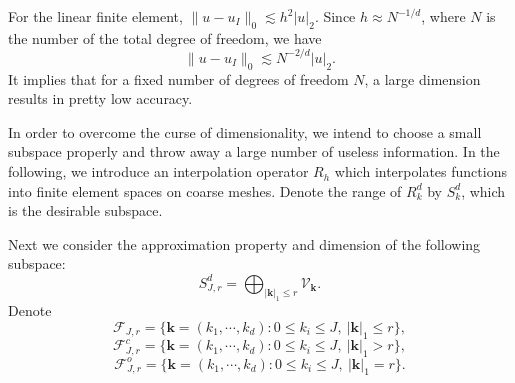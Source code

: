 For the linear finite element,
$
\|u-u_I\|_0\lesssim h^2|u|_2.
$
Since $h\approx N^{-1/d}$, where $N$ is the number of the total degree of freedom, we have
$$
\|u-u_I\|_0\lesssim N^{-2/d}|u|_2.
$$
It implies that for a fixed number of degrees of freedom $N$, a large dimension results in pretty low accuracy.

In order to overcome the curse of dimensionality, we intend to choose a small subspace properly and throw away a large number of useless information. In the following, we introduce an interpolation operator $R_h$ which interpolates functions into finite element spaces on coarse meshes. Denote the range of $R_k^d$ by $S_k^d$, which is the desirable subspace.

Next we consider the approximation property and dimension  of the following subspace:
$$
S_{J,r}^d = \bigoplus_{|\mathbf{k}|_1 \le r}\mathcal V_{\mathbf{k}}.
$$
Denote
$$
\mathcal F_{J,r}=\{\mathbf k=(k_1,\cdots,k_d): 0\leq k_i\leq J, \ |\mathbf k|_1\leq r\},
$$
$$
\mathcal F_{J,r}^c=\{\mathbf k=(k_1,\cdots,k_d): 0\leq k_i\leq J, \ |\mathbf k|_1> r\},
$$
$$
\mathcal F_{J,r}^o=\{\mathbf k=(k_1,\cdots,k_d): 0\leq k_i\leq J, \ |\mathbf k|_1= r\}.
$$


%

